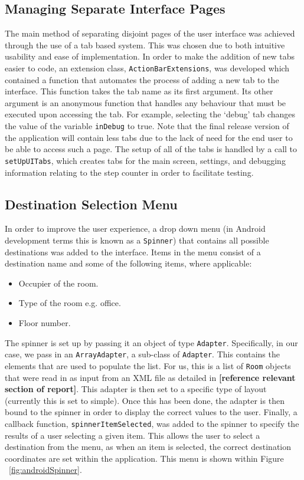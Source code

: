 \documentclass[12pt,a4paper]{report}
\begin{document}
        \subsection{Managing Separate Interface Pages}
            The main method of separating disjoint pages of the user interface was achieved through the use of a tab based system. This was chosen due
            to both intuitive usability and ease of implementation. In order to make the addition of new tabs easier to code, an extension class,
            \texttt{ActionBarExtensions}, was developed which contained a function that automates the process of adding a new tab to the
            interface. This function takes the tab name as its first argument. Its other argument is an anonymous function that handles any behaviour
            that must be executed upon accessing the tab. For example, selecting the `debug' tab changes the value of the variable \texttt{inDebug} to
            true. Note that the final release version of the application will contain less tabs due to the lack of need for the end user to be able to access
            such a page. The setup of all of the tabs is handled by a call to \texttt{setUpUITabs}, which creates tabs for the main screen, settings, and 
            debugging information relating to the step counter in order to facilitate testing.
        \subsection{Destination Selection Menu}
            In order to improve the user experience, a drop down menu (in Android development terms this is known as a \texttt{Spinner}) that contains
            all possible destinations was added to the interface. Items in the menu consist of a destination name and some of the following items,
            where applicable:
            \begin{itemize}
                \item Occupier of the room.
                \item Type of the room e.g. office.
                \item Floor number.
            \end{itemize}
            The spinner is set up by passing it an object of type \texttt{Adapter}. Specifically, in our case, we pass in an \texttt{ArrayAdapter}, a sub-class of \texttt{Adapter}.
            This contains the elements
            that are used to populate the list. For us, this is a list of \texttt{Room} objects that were read in as input from an XML file as detailed in
            \textbf{[reference relevant section of report]}.
            This adapter is then set to a specific type of layout (currently this is set to simple). Once this has been done, the adapter is then bound to the spinner in order to display
            the correct values to the user. Finally, a callback function, \texttt{spinnerItemSelected}, was added to the spinner to specify the results of a user selecting a given item.
            This allows the user to select a destination from the menu, as when an item is selected, the correct destination coordinates are set within the application. This menu is shown within Figure ~\ref{fig:androidSpinner}.
       
\end{document}
